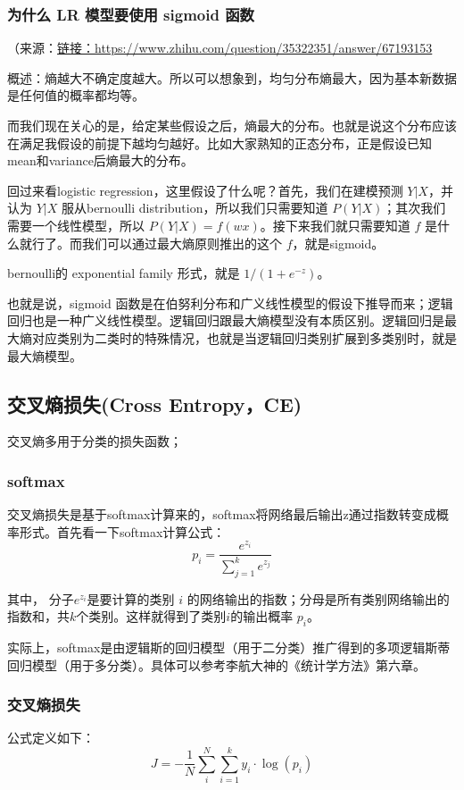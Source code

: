 \documentclass[12pt]{article}
\begin{document}
\subsubsection{为什么 LR 模型要使用 sigmoid 函数}
（来源：\url{链接：https://www.zhihu.com/question/35322351/answer/67193153}

概述：熵越大不确定度越大。所以可以想象到，均匀分布熵最大，因为基本新数据是任何值的概率都均等。

而我们现在关心的是，给定某些假设之后，熵最大的分布。也就是说这个分布应该在满足我假设的前提下越均匀越好。比如大家熟知的正态分布，正是假设已知mean和variance后熵最大的分布。

回过来看logistic regression，这里假设了什么呢？首先，我们在建模预测 $Y|X$，并认为 $Y|X$ 服从bernoulli distribution，所以我们只需要知道 $P(Y|X)$；其次我们需要一个线性模型，所以 $P(Y|X) = f(wx)$。接下来我们就只需要知道 $f$ 是什么就行了。而我们可以通过最大熵原则推出的这个 $f$，就是sigmoid。

bernoulli的 exponential family 形式，就是 $1/ (1 + e^{-z})$。

也就是说，sigmoid 函数是在伯努利分布和广义线性模型的假设下推导而来；逻辑回归也是一种广义线性模型。逻辑回归跟最大熵模型没有本质区别。逻辑回归是最大熵对应类别为二类时的特殊情况，也就是当逻辑回归类别扩展到多类别时，就是最大熵模型。

\subsection{交叉熵损失(Cross Entropy，CE)\cite{Commonly_Loss_Functions}}
交叉熵多用于分类的损失函数；

\subsubsection{softmax}
交叉熵损失是基于softmax计算来的，softmax将网络最后输出z通过指数转变成概率形式。首先看一下softmax计算公式：
$$
p_i = \frac{e^{z_i}}{\sum_{j=1}^ke^{z_j}}
$$

其中， 分子$e^{z_i}$是要计算的类别 $i$ 的网络输出的指数；分母是所有类别网络输出的指数和，共$k$个类别。这样就得到了类别$i$的输出概率 $p_i$。

实际上，softmax是由逻辑斯的回归模型（用于二分类）推广得到的多项逻辑斯蒂回归模型（用于多分类）。具体可以参考李航大神的《统计学方法》第六章。

\subsubsection{交叉熵损失}
公式定义如下：
$$
J = -\frac{1}{N}\sum_i^N\sum_{i=1}^ky_i\cdot\log{(p_i)}
$$
\end{document}
